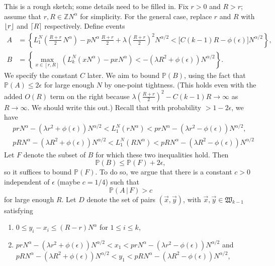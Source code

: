 \documentclass[12pt]{article}
\DeclarePairedDelimiter\floor{\lfloor}{\rfloor}
\begin{document}
	This is a rough sketch; some details need to be filled in. Fix $r>0$ and $R>r$; assume that $r,R\in\mathbb{Z}N^\alpha$ for simplicity. For the general case, replace $r$ and $R$ with $\floor{r}$ and $\lceil R\rceil$ respectively. Define events
	\begin{align*}
	A &= \left\{L_1^N\left(\frac{R+r}{2}\,N^\alpha\right) - pN^\alpha\,\frac{R+r}{2} + \lambda\left(\frac{R+r}{2}\right)^2 N^{\alpha/2} < \big[C(k-1)R-\phi(\epsilon)\big]N^{\alpha/2}\right\},\\
	B &= \left\{\max_{x\in[r,R]} \left(L_k^N(xN^\alpha) - pxN^\alpha\right) < -(\lambda R^2 + \phi(\epsilon)) N^{\alpha/2} \right\}.
	\end{align*}
	We specify the constant $C$ later. We aim to bound $\mathbb{P}(B)$, using the fact that $\mathbb{P}(A) \leq 2\epsilon$ for large enough $N$ by one-point tightness. (This holds even with the added $O(R)$ term on the right because $\lambda(\frac{R+r}{2})^2 - C(k-1)R \to \infty$ as $R\to\infty$. We should write this out.) Recall that with probability $>1-2\epsilon$, we have 
	\begin{align*}
	& prN^\alpha - (\lambda r^2+\phi(\epsilon))N^{\alpha/2} < L_1^N(rN^\alpha) <  prN^\alpha - (\lambda r^2-\phi(\epsilon))N^{\alpha/2},\\
	& pRN^\alpha - (\lambda R^2+\phi(\epsilon))N^{\alpha/2} < L_1^N(RN^\alpha) <  pRN^\alpha - (\lambda R^2-\phi(\epsilon))N^{\alpha/2}
	\end{align*}
	Let $F$ denote the subset of $B$ for which these two inequalities hold. Then 
	\[
	\mathbb{P}(B) \leq \mathbb{P}(F) + 2\epsilon,
	\]
	so it suffices to bound $\mathbb{P}(F)$. To do so, we argue that there is a constant $c>0$ independent of $\epsilon$ (maybe $c=1/4$) such that
	\[
	\mathbb{P}(A\,|\,F) > c
	\]
	for large enough $R$. Let $D$ denote the set of pairs $(\vec{x},\vec{y})$, with $\vec{x},\vec{y}\in\mathfrak{W}_{k-1}$ satisfying 
	\begin{enumerate}[label=(\arabic*)]
		
		\item $0\leq y_i - x_i \leq (R-r)N^\alpha$ for $1\leq i\leq k$,
		
		\item $prN^\alpha - (\lambda r^2+\phi(\epsilon))N^{\alpha/2} < x_1 <  prN^\alpha - (\lambda r^2-\phi(\epsilon))N^{\alpha/2}$ and $pRN^\alpha - (\lambda R^2+\phi(\epsilon))N^{\alpha/2} < y_1 <  pRN^\alpha - (\lambda R^2-\phi(\epsilon))N^{\alpha/2}$,
		
	\end{enumerate}
	
\end{document}

